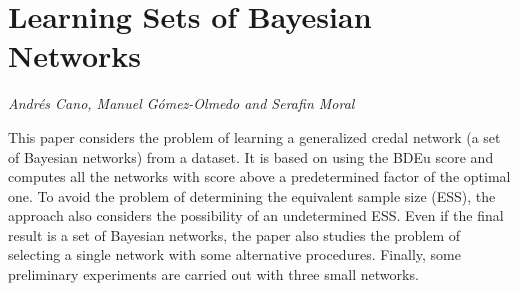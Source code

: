 \documentclass[../booklet.tex]{subfiles}
\begin{document}
\section[Learning Sets of Bayesian Networks. {\it Andrés Cano, Manuel Gómez-Olmedo and Serafin Moral}]{Learning Sets of Bayesian Networks}
  

\begin{center}
  {\it Andrés Cano, Manuel Gómez-Olmedo and Serafin Moral}
\end{center}

\vskip 0.8cm


This paper considers the problem of learning a  generalized credal network (a set of Bayesian networks) from a dataset. It is based on using the BDEu score and computes all the networks with score above a predetermined factor of the optimal one. To avoid the problem of determining the equivalent sample size (ESS), the approach also considers the possibility of an undetermined ESS. Even if the final result is a set of Bayesian networks, the paper also studies the problem of selecting a single network with some alternative procedures. Finally, some preliminary experiments are carried out with three small networks. 

\end{document}
